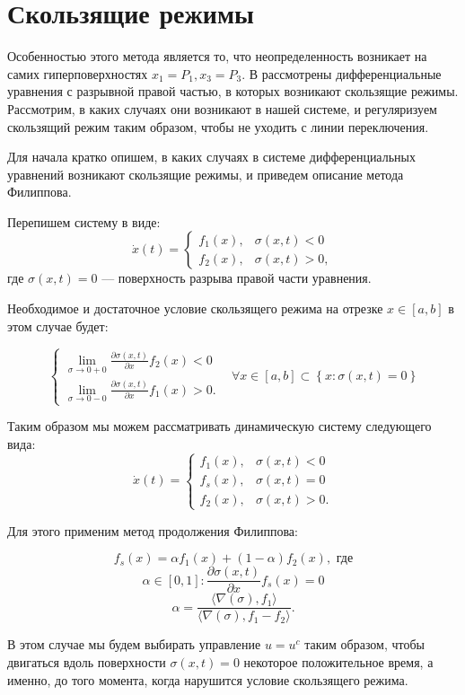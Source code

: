 \documentclass[11pt]{article}
\theoremstyle{definition}
\newcommand\Set[2]{\left\{ #1 \colon #2 \right\}}
\newcommand\dd[2]{\frac{\partial#1}{\partial#2}}
\begin{document}
\section{Скользящие режимы} 
	\indent Особенностью этого метода является то, что неопределенность возникает на самих гиперповерхностях $x_1 = P_1, x_3 = P_3.$ В \cite{Filippov} рассмотрены дифференциальные уравнения с разрывной правой частью, в которых возникают скользящие режимы. Рассмотрим, в каких случаях они возникают в нашей системе, и регуляризуем скользящий режим таким образом, чтобы не уходить с линии переключения.

	Для начала кратко опишем, в каких случаях в системе дифференциальных уравнений возникают скользящие режимы, и приведем описание метода Филиппова.

	Перепишем систему в виде:
$$\dot x(t) = \begin{cases} f_1(x), & \sigma(x,t) < 0 \\ f_2(x), & \sigma(x,t) > 0,\end{cases}$$
	где $\sigma(x,t) = 0$ --- поверхность разрыва правой части уравнения.

	Необходимое и достаточное условие скользящего режима на отрезке $x \in [a, b]$ в этом случае будет:

$$
\left\{
\begin{aligned}
    \lim_{\sigma \to 0+0}\dd{\sigma(x,t)}{x} f_2(x) < 0 \\
    \lim_{\sigma \to 0-0} \dd{\sigma(x,t)}{x} f_1(x) > 0.
\end{aligned}
\right.
\;\;\; \forall x \in [a, b] \subset \Set{x}{\sigma(x,t) = 0}
$$

	Таким образом мы можем рассматривать динамическую систему следующего вида:
$$\dot x(t) = \begin{cases} f_1(x), & \sigma(x,t) < 0 \\ f_s(x), & \sigma(x,t) = 0 \\ f_2(x), & \sigma(x,t) > 0.\end{cases}$$

 	Для этого применим метод продолжения Филиппова:

$$f_s(x) = \alpha f_1(x) + (1 - \alpha) f_2(x), \text{  где}$$
$$\alpha \in [0, 1] : \dd{\sigma(x,t)}{x} f_s(x) = 0$$
$$\alpha = \frac{\langle \nabla(\sigma), f_1\rangle}{\langle \nabla(\sigma), f_1 - f_2 \rangle}.$$

	В этом случае мы будем выбирать управление $u = u^c$ таким образом, чтобы двигаться вдоль поверхности $\sigma(x,t) = 0$ некоторое положительное время, а именно, до того момента, когда нарушится условие скользящего режима.
\end{document}

